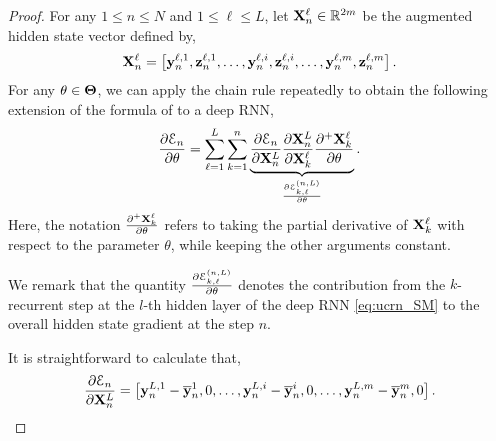 \documentclass{article}
\newcommand{\by}{{\bf y}}
\newcommand{\bz}{{\bf z}}
\newcommand{\bX}{{\bf X}}
\newcommand{\R}{{\mathbb R}}
\newcommand{\E}{\EuScript{E}}
\begin{document}
\begin{proof}
For any $1 \leq n \leq N$ and $1 \leq \ell \leq L$, let $\bX^\ell_n \in \R^{2m}$ be the augmented hidden state vector defined by,
\begin{equation}
    \label{eq:bx}
\bX^\ell_n = \left[\by^{\ell,1}_n,\bz^{\ell,1}_n,\ldots,\by^{\ell,i}_n,\bz^{\ell,i}_n,\ldots,\by^{\ell,m}_n,\bz^{\ell,m}_n  \right].
\end{equation}
For any $\theta \in {\bf \Theta}$, we can apply the chain rule repeatedly to obtain the following extension of the formula of \cite{vanish_grad} to a deep RNN,
\begin{equation}
\label{eq:grad2_SM}
\frac{\partial \E_n}{\partial \theta} = \sum\limits_{\ell=1}^L\sum\limits_{k=1}^n \underbrace{\frac{\partial \E_n}{\partial \bX^L_n} \frac{\partial \bX^L_n}{\partial \bX^\ell_k} \frac{\partial^{+} \bX^\ell_k}{\partial \theta}}_{\frac{\partial \E^{(n,L)}_{k,\ell}}{\partial \theta}}.
\end{equation}
Here, the notation $\frac{\partial^{+} \bX^\ell_k}{\partial \theta}$ refers to taking the partial derivative of $\bX^\ell_k$ with respect to the parameter $\theta$, while keeping the other arguments constant. 

We remark that the quantity $\frac{\partial \E^{(n,L)}_{k,\ell}}{\partial \theta}$ denotes the contribution from the $k$-recurrent step at the $l$-th hidden layer of the deep RNN \eqref{eq:ucrn_SM} to the overall hidden state gradient at the step $n$. 

It is straightforward to calculate that,
\begin{equation}
    \label{eq:1gd}
  \frac{\partial \E_n}{\partial \bX^L_n} = \left[\by^{L,1}_n-\overline{\by}^1_n,0,\ldots,\by^{L,i}_n-\overline{\by}^i_n,0,\ldots,\by^{L,m}_n-\overline{\by}^m_n,0\right].
  \end{equation}


\end{proof}
\end{document}
